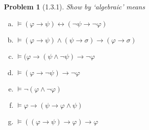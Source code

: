 \documentclass[letter]{article}
\newtheorem{problem}{Problem}
\theoremstyle{definition}
\renewcommand{\phi}{\varphi}
\begin{document}
\begin{problem}[1.3.1] Show by `algebraic' means
 \begin{enumerate}[(a)]
     \item $\models (\phi \to \psi) \leftrightarrow (\neg \psi \to \neg \phi)$
     \item $\models (\phi \to \psi) \land (\psi \to \sigma) \to (\phi \to \sigma)$
     \item $\models (\phi \to (\psi \land \neg \psi) \to \neg \phi$
     \item $\models (\phi \to \neg \psi) \to \neg \phi$
     \item $\models \neg (\phi \land \neg \phi)$
     \item $\models \phi \to (\psi \to \phi \land \psi)$
     \item $\models ((\phi \to \psi) \to \phi) \to \phi$
 \end{enumerate}
\end{problem}
\end{document}

